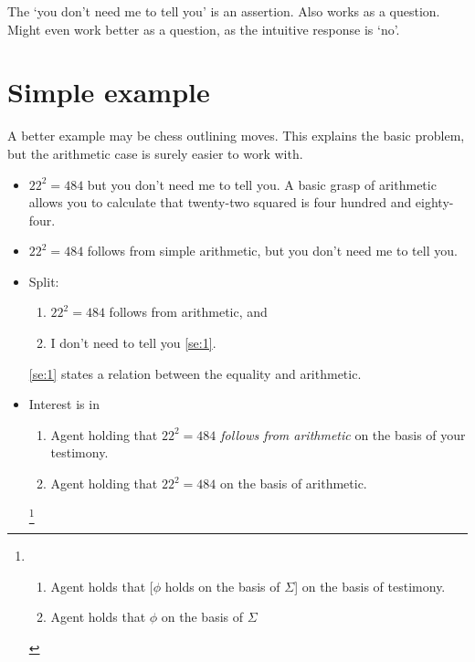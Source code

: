 \documentclass[10pt]{article}
\begin{document}
{
  \color{red}
  The `you don't need me to tell you' is an assertion.
  Also works as a question.
  Might even work better as a question, as the intuitive response is `no'.
  
}





\section{Simple example}
\label{sec:simple-example}

{
  \color{red}
  A better example may be chess outlining moves.
  This explains the basic problem, but the arithmetic case is surely easier to work with.
}

\begin{itemize}
\item \(22^{2} = 484\) but you don't need me to tell you.
  A basic grasp of arithmetic allows you to calculate that twenty-two squared is four hundred and eighty-four.
\item \(22^{2} = 484\) follows from simple arithmetic, but you don’t need me to tell you.
\item Split:
  \begin{enumerate}
  \item\label{se:1} \(22^{2} = 484\) follows from arithmetic, and
  \item\label{se:2} I don't need to tell you \ref{se:1}.
  \end{enumerate}
  \ref{se:1} states a relation between the equality and arithmetic.
\item Interest is in
  \begin{enumerate}[label=\ref{se:1}\alph*.]
  \item\label{se:1:t} Agent holding that \emph{\(22^{2} = 484\) follows from arithmetic} on the basis of your testimony.
  \item\label{se:1:d} Agent holding that \(22^{2} = 484\) on the basis of arithmetic.
  \end{enumerate}
  \footnote{
    \color{red}
    \begin{enumerate}
    \item Agent holds that [\(\phi\) holds on the basis of \(\Sigma\)] on the basis of testimony.
    \item Agent holds that \(\phi\) on the basis of \(\Sigma\)
    \end{enumerate}

}
\end{itemize}
\end{document}
